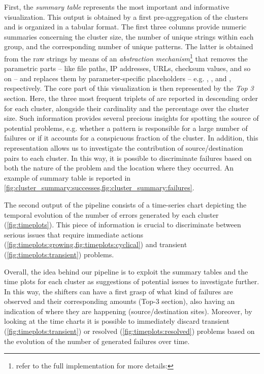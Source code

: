 First, the \textit{summary table} represents the most important and informative visualization.
This output is obtained by a first pre-aggregation of the clusters and is organized in a tabular format.
The first three columns provide numeric summaries concerning the  cluster size, the number of unique strings within each group, and the corresponding number of unique patterns.
The latter is obtained from the raw strings by means of an \textit{abstraction mechanism}\footnote{refer to the full implementation for more details: \githubabstractions} that removes the parametric parts -- like file paths, IP addresses, URLs, checksum values, and so on -- and replaces them by parameter-specific placeholders -- e.g. , ,  and  , respectively.
The core part of this visualization is then represented by the \textit{Top 3} section. Here, the three most frequent triplets of  are reported in descending order for each cluster, alongside their cardinality and the percentage over the cluster size.
Such information provides several precious insights for spotting the source of potential problems, e.g. whether a pattern is responsible for a large number of failures or if it accounts for a conspicuous fraction of the cluster. 
In addition, this representation allows us to investigate the contribution of source/destination pairs to each cluster.
In this way, it is possible to discriminate failures based on both the nature of the problem and the location where they occurred.
An example of summary table is reported in \cref{fig:cluster_summary:successes,fig:cluster_summary:failures}.

The second output of the pipeline consists of a time-series chart depicting the temporal evolution of the number of errors generated by each cluster
(\cref{fig:timeplots}).
This piece of information is crucial to discriminate between serious issues that require immediate actions (\cref{fig:timeplots:growing,fig:timeplots:cyclical}) and transient (\cref{fig:timeplots:transient}) problems. 

Overall, the idea behind our pipeline is to exploit the summary tables and the time plots for each cluster as suggestions of potential issues to investigate further.
In this way, the shifters can have a first grasp of what kind of failures are observed and their corresponding amounts (Top-3 section), also having an indication of where they are happening (source/destination sites).
Moreover, by looking at the time charts it is possible to immediately discard transient (\cref{fig:timeplots:transient}) or resolved (\cref{fig:timeplots:resolved}) problems based on the evolution of the number of generated failures over time.


